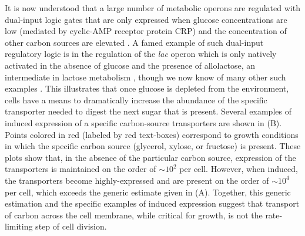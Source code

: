 It is now understood that a large number of metabolic operons are regulated
with dual-input logic gates that are only expressed when glucose
concentrations are low (mediated by cyclic-AMP receptor protein CRP) and the
concentration of other carbon sources are elevated \citep{gama-castro2016, zhang2014a}. A
famed example of such dual-input regulatory logic is in the regulation of the
\textit{lac} operon which is only natively activated in the absence of glucose and the
presence of allolactose, an intermediate in lactose metabolism \citep{jacob1961}, though
we now know of many other such examples \citep{ireland2020, gama-castro2016,
belliveau2018}. This illustrates that once glucose is depleted from the
environment, cells have a means to dramatically increase the abundance of the
specific transporter needed to digest the next sugar that is present. Several
examples of induced expression of a specific carbon-source transporters are
shown in (B). Points colored in red (labeled by red
text-boxes) correspond to growth conditions in which the specific carbon source
(glycerol, xylose, or fructose) is present. These plots show that, in the
absence of the particular carbon source, expression of the transporters is
maintained on the order of $\sim 10^2$ per cell. However, when induced, the
transporters become highly-expressed and are present on the order of $\sim
10^4$ per cell, which exceeds the generic estimate given in
(A). Together, this generic estimation and the specific
examples of induced expression suggest that transport of carbon across the cell
membrane, while critical for growth, is not the rate-limiting step of cell division.

